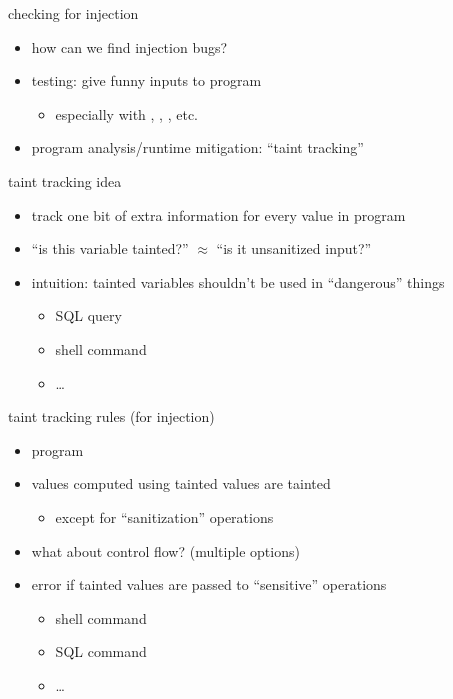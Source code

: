 \begin{frame}{checking for injection}
    \begin{itemize}
        \item how can we find injection bugs?
        \item<2-> testing: give funny inputs to program
            \begin{itemize}
                \item especially with , , \fbox{\texttt{;}}, \fbox{\texttt{\textbackslash}} etc.
            \end{itemize}
        \item<2-> program analysis/runtime mitigation: ``taint tracking''
    \end{itemize}
\end{frame}

\begin{frame}{taint tracking idea}
    \begin{itemize}
        \item track one bit of extra information for every value in program
        \item ``is this variable tainted?'' $\approx$ ``is it unsanitized input?''
        \item intuition: tainted variables shouldn't be used in ``dangerous'' things
            \begin{itemize}
                \item SQL query
                \item shell command
                \item \ldots
            \end{itemize}
    \end{itemize}
\end{frame}

\begin{frame}{taint tracking rules (for injection)}
    \begin{itemize}
        \item program 
        \item {} values computed using tainted values are tainted
            \begin{itemize}
            \item except for  ``sanitization'' operations
            \end{itemize}
        \item what about control flow? (multiple options)
        \item error if tainted values are passed to ``sensitive'' operations
            \begin{itemize}
            \item shell command
            \item SQL command
            \item \ldots
            \end{itemize}
    \end{itemize}
\end{frame}

